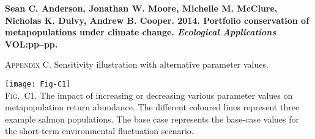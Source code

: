 \documentclass[12pt]{article}
\begin{document}
\textbf{Sean C. Anderson, Jonathan W. Moore, Michelle M. McClure, Nicholas K. Dulvy, Andrew B. Cooper. 2014. Portfolio conservation of metapopulations under climate change. \textit{Ecological Applications} VOL:pp--pp.}

\bigskip

\textsc{Appendix C.} Sensitivity illustration with alternative parameter values.

\bigskip

\texttt{[image: Fig-C1]}\\
\textsc{Fig.~C1.} The impact of increasing or decreasing various parameter values on metapopulation return abundance. The different coloured lines represent three example salmon populations. The base case represents the base-case values for the short-term environmental fluctuation scenario.
\end{document}
